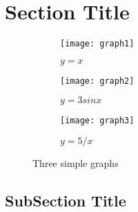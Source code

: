 \section{Section Title}


\begin{figure}
    \centering
    \begin{subfigure}[b]{0.3\textwidth}
        \centering
        \texttt{[image: graph1]}
        \caption{$y=x$}
        \label{fig:y equals x}
    \end{subfigure}
    \hfill
    \begin{subfigure}[b]{0.3\textwidth}
        \centering
        \texttt{[image: graph2]}
        \caption{$y=3sinx$}
        \label{fig:three sin x}
    \end{subfigure}
    \hfill
    \begin{subfigure}[b]{0.3\textwidth}
        \centering
        \texttt{[image: graph3]}
        \caption{$y=5/x$}
        \label{fig:five over x}
    \end{subfigure}
    \caption{Three simple graphs}
    \label{fig:three graphs}
\end{figure}



\subsection{SubSection Title}
